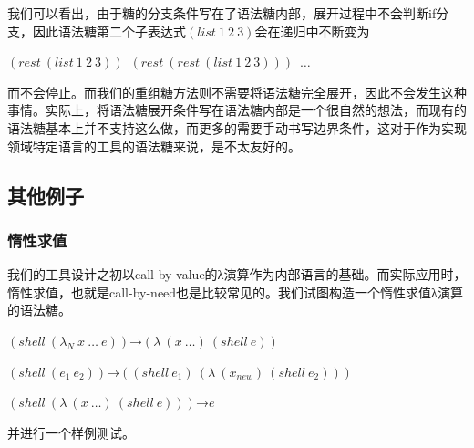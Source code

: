 我们可以看出，由于糖的分支条件写在了语法糖内部，展开过程中不会判断if分支，因此语法糖第二个子表达式$(list~1~2~3)$会在递归中不断变为
\begin{flushleft}
	$(rest~(list~1~2~3))$~$(rest~(rest~(list~1~2~3)))$~$\ldots$
\end{flushleft}
而不会停止。而我们的重组糖方法则不需要将语法糖完全展开，因此不会发生这种事情。实际上，将语法糖展开条件写在语法糖内部是一个很自然的想法，而现有的语法糖基本上并不支持这么做，而更多的需要手动书写边界条件，这对于作为实现领域特定语言的工具的语法糖来说，是不太友好的。

\subsection{其他例子}

\subsubsection{惰性求值}

我们的工具设计之初以call-by-value的λ演算作为内部语言的基础。而实际应用时，惰性求值，也就是call-by-need也是比较常见的。我们试图构造一个惰性求值λ演算的语法糖。

\begin{flushleft}
	$(shell~(\lambda_{N}~x~\ldots~e))$→$(\lambda~(x~\ldots)~(shell~e))$
	
	$(shell~(e_{1}~e_{2}))$→$((shell~e_{1})~(\lambda~(x_{new})~(shell~e_{2})))$
	
	$(shell~(\lambda~(x~\ldots)~(shell~e)))$→$e$
\end{flushleft}

并进行一个样例测试。

\begin{center}
\end{center}

